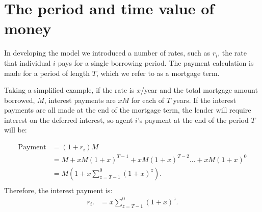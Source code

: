 

\section{The period and time value of money}
In developing the model we introduced a number of rates, such as $r_i$, the rate that individual $i$ pays for a single borrowing period. The payment calculation is made for a period of length $T$, which we refer to as a mortgage term.

Taking a simplified example, if the rate is $x$/year  and  the total mortgage amount borrowed, $M$, interest payments are $xM$  for each of $T$ years. 
If the interest payments are all made at the end of the mortgage term, the lender will require interest on the deferred interest, so agent $i$'s payment at the end of the period $T$ will be:

\begin{align*}
\text{Payment} &= (1+r_i)M                                 \\ 
    &= M + xM(1+x)^{T-1}+ xM(1+x)^{T-2}\dots + xM(1+x)^{0} \\
    &= M\left(1+ x\sum_{z=T-1}^0(1+x)^{z}\right).          \\ 
\end{align*}
Therefore, the interest payment is:
\begin{align*}
r_i.   &=x\sum_{z=T-1}^0(1+x)^{z}.
\end{align*}

